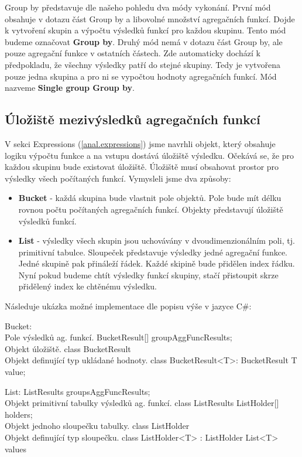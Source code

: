 Group by představuje dle našeho pohledu dva módy vykonání.
První mód obsahuje v dotazu část Group by a libovolné množství agregačních funkcí.
Dojde k vytvoření skupin a výpočtu výsledků funkcí pro každou skupinu.
Tento mód budeme označovat \textbf{Group by}.
Druhý mód nemá v dotazu část Group by, ale pouze agregační funkce v ostatních částech.
Zde automaticky dochází k předpokladu, že všechny výsledky patří do stejné skupiny.
Tedy je vytvořena pouze jedna skupina a pro ni se vypočtou hodnoty agregačních funkcí.
Mód nazveme \textbf{Single group Group by}.


\subsection{Úložiště mezivýsledků agregačních funkcí} \label{anal.groupby.uloziste}

V sekci Expressions (\ref{anal.expressions}) jsme navrhli objekt, který obsahuje logiku výpočtu funkce a na vstupu dostává úložiště výsledku.
Očekává se, že pro každou skupinu bude existovat úložiště.
Úložiště musí obsahovat prostor pro výsledky všech počítaných funkcí.
Vymysleli jsme dva způsoby:

\begin{itemize}

\item \textbf{Bucket} - každá skupina bude vlastnit pole objektů. 
Pole bude mít délku rovnou počtu počítaných agregačních funkcí.
Objekty představují úložiště výsledků funkcí.

\item \textbf{List} - výsledky všech skupin jsou uchovávány v dvoudimenzionálním poli, tj. primitivní tabulce.
Sloupeček představuje výsledky jedné agregační funkce.
Jedné skupině pak přináleží řádek.
Každé skipině bude přidělen index řádku.
Nyní pokud budeme chtít výsledky funkcí skupiny, stačí přistoupit skrze přidělený index ke chtěnému výsledku.
\end{itemize}

Následuje ukázka možné implementace dle popisu výše v jazyce C\#:
\begin{code}
Bucket:
\\ Pole výsledků ag. funkcí.
BucketResult[] groupAggFuncResults; 
\\ Objekt úložiště. 
class BucketResult {} 
\\ Objekt definující typ ukládané hodnoty.
class BucketResult<T>: BucketResult { T value; }

List:
ListResults groupsAggFuncResults;
\\ Objekt primitivní tabulky výsledků ag. funkcí.
class ListResults { ListHolder[] holders; }
\\ Objekt jednoho sloupečku tabulky.
class ListHolder {}
\\ Objekt definující typ sloupečku.
class ListHolder<T> : ListHolder { List<T> values }
\end{code}

